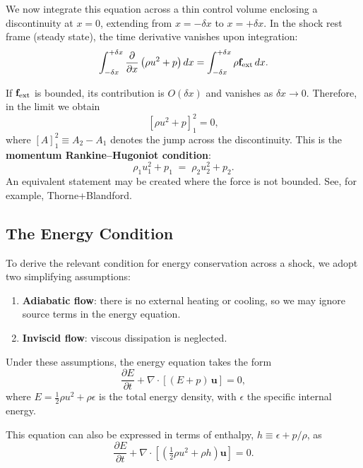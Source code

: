 \medskip

We now integrate this equation across a thin control volume enclosing a discontinuity at $x = 0$, extending from $x = -\delta x$ to $x = +\delta x$. In the shock rest frame (steady state), the time derivative vanishes upon integration:
\begin{equation}
\int_{-\delta x}^{+\delta x} 
\frac{\partial}{\partial x} \left( \rho u^2 + p \right) dx
= \int_{-\delta x}^{+\delta x} \rho {\bf f}_{\rm ext} \, dx.
\end{equation}

If ${\bf f}_{\rm ext}$ is bounded, its contribution is $O(\delta x)$ and vanishes as $\delta x \to 0$. Therefore, in the limit we obtain
\begin{equation}
\left[ \rho u^2 + p \right]_{1}^{2} = 0,
\end{equation}
where $[A]_1^2 \equiv A_2 - A_1$ denotes the jump across the discontinuity. This is the \textbf{momentum Rankine–Hugoniot condition}:
\begin{equation}
\boxed{
\rho_1 u_1^2 + p_1 \;=\; \rho_2 u_2^2 + p_2.}
\end{equation}
An equivalent statement may be created where the force is not bounded. See, for example, Thorne+Blandford.

\subsection*{The Energy Condition}

To derive the relevant condition for energy conservation across a shock, we adopt two simplifying assumptions:

\begin{enumerate}
    \item \textbf{Adiabatic flow}: there is no external heating or cooling, so we may ignore source terms in the energy equation.
    \item \textbf{Inviscid flow}: viscous dissipation is neglected.
\end{enumerate}

\noindent
Under these assumptions, the energy equation takes the form
\[
\frac{\partial E}{\partial t} + \nabla \cdot \left[(E+p)\,\mathbf{u}\right] = 0,
\]
where $E = \tfrac{1}{2}\rho u^2 + \rho \epsilon$ is the total energy density, with $\epsilon$ the specific internal energy.  

\medskip
This equation can also be expressed in terms of enthalpy, $h \equiv \epsilon + p/\rho$, as
\[
\frac{\partial E}{\partial t} + \nabla \cdot \left[\left(\tfrac{1}{2}\rho u^2 + \rho h\right)\mathbf{u}\right] = 0.
\]
\medskip

